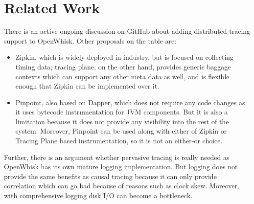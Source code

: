 \chapter{Related Work}

There is an active ongoing discussion on GitHub\cite{web:ghissue} about adding distributed tracing support to OpenWhisk. Other proposals on the table are:
\begin{itemize}
  \item Zipkin\cite{web:zipkin}, which is widely deployed in industry\cite{mace2017survey}, but is focused on collecting timing data; tracing plane, on the other hand, provides generic baggage contexts which can support any other meta data as well, and is flexible enough that Zipkin can be implemented over it.
  \item Pinpoint\cite{web:pinpoint}, also based on Dapper, which does not require any code changes as it uses bytecode instrumentation for JVM components. But it is also a limitation because it does not provide any visibility into the rest of the system. Moreover, Pinpoint can be used along with either of Zipkin or Tracing Plane based instrumentation, so it is not an either-or choice.
\end{itemize}

Further, there is an argument whether pervasive tracing is really needed as OpenWhisk has its own mature logging implementation. But logging does not provide the same benefits as causal tracing because it can only provide correlation which can go bad because of reasons such as clock skew. Moreover, with comprehensive logging disk I/O can become a bottleneck.
